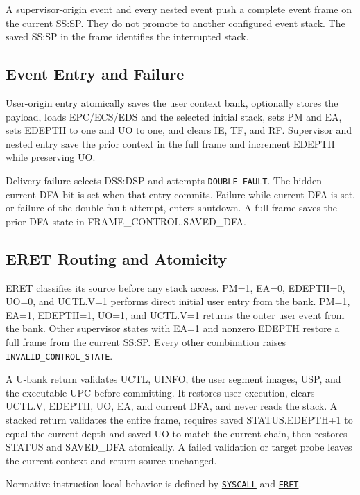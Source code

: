 A supervisor-origin event and every nested event push a complete event frame on the current SS:SP. They do not promote to another configured event stack. The saved SS:SP in the frame identifies the interrupted stack.

\subsection{Event Entry and Failure}
User-origin entry atomically saves the user context bank, optionally stores the payload, loads EPC/ECS/EDS and the selected initial stack, sets PM and EA, sets EDEPTH to one and UO to one, and clears IE, TF, and RF. Supervisor and nested entry save the prior context in the full frame and increment EDEPTH while preserving UO.

Delivery failure selects DSS:DSP and attempts \texttt{DOUBLE\_FAULT}. The hidden current-DFA bit is set when that entry commits. Failure while current DFA is set, or failure of the double-fault attempt, enters shutdown. A full frame saves the prior DFA state in FRAME\_CONTROL.SAVED\_DFA.

\subsection{ERET Routing and Atomicity}
ERET classifies its source before any stack access. PM=1, EA=0, EDEPTH=0, UO=0, and UCTL.V=1 performs direct initial user entry from the bank. PM=1, EA=1, EDEPTH=1, UO=1, and UCTL.V=1 returns the outer user event from the bank. Other supervisor states with EA=1 and nonzero EDEPTH restore a full frame from the current SS:SP. Every other combination raises \texttt{INVALID\_CONTROL\_STATE}.

A U-bank return validates UCTL, UINFO, the user segment images, USP, and the executable UPC before committing. It restores user execution, clears UCTL.V, EDEPTH, UO, EA, and current DFA, and never reads the stack. A stacked return validates the entire frame, requires saved STATUS.EDEPTH+1 to equal the current depth and saved UO to match the current chain, then restores STATUS and SAVED\_DFA atomically. A failed validation or target probe leaves the current context and return source unchanged.

Normative instruction-local behavior is defined by \hyperref[instr:syscall]{\texttt{SYSCALL}} and \hyperref[instr:eret]{\texttt{ERET}}.\par
